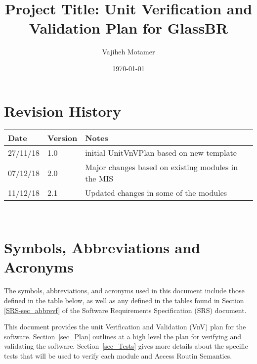 \documentclass[12pt]{article}
\newcommand{\progname}{GlassBR}
\begin{document}
\title{Project Title: Unit Verification and Validation Plan for \progname{}} 
\author{Vajiheh Motamer}
\date{\today}
	
\maketitle


\section{Revision History}

\begin{tabularx}{\textwidth}{p{3cm}p{2cm}X}
\toprule {\bf Date} & {\bf Version} & {\bf Notes}\\
\midrule
27/11/18 & 1.0 & initial UnitVnVPlan based on new template\\
07/12/18 & 2.0 & Major changes based on existing modules in the MIS\\
11/12/18 & 2.1 &  Updated changes in some of the modules\\

\bottomrule
\end{tabularx}

~\newpage

\tableofcontents

\listoftables



\newpage

\section{Symbols, Abbreviations and Acronyms}
The symbols, abbreviations, and acronyms used in this document include those
defined in the table below, as well as any defined in the tables found in
Section \ref{SRS-sec_abbrevf}  of the Software
Requirements Specification (SRS) document.  \newline

\newpage


This document provides the unit Verification and Validation (VnV) plan for the
software. Section~\ref{sec_Plan} outlines at a high level the plan for verifying
and validating the software. Section~\ref{sec_Tests} gives more details about
the specific tests that will be used to verify each module and Access Routin
 Semantics.  
\end{document}
